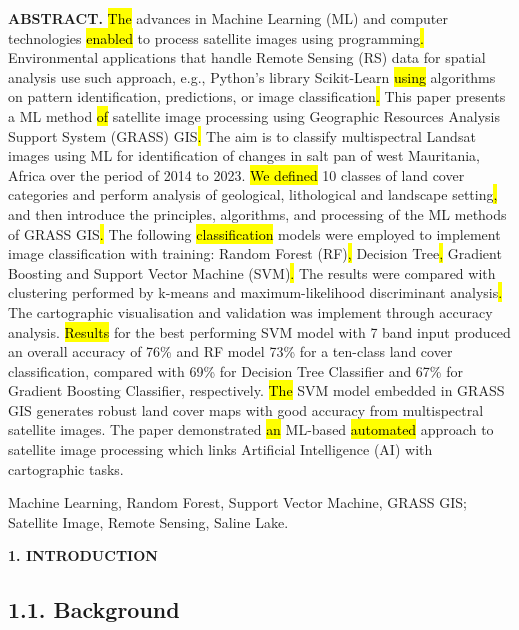 \documentclass[12pt,a4paper,oneside]{article}
\def \newsection{\vspace{12pt}\textbf}
\def \newpar{\vspace{6pt}}
\begin{document}
{\bf ABSTRACT.} \hl{The} advances in Machine Learning (ML) and computer technologies \hl{enabled} to process satellite images using programming\hl{. }Environmental applications that handle Remote Sensing (RS) data for spatial analysis use such approach, e.g., Python's library Scikit-Learn \hl{using} algorithms on pattern identification, predictions, or image classification\hl{. }This paper presents a ML method\hl{ of }satellite image processing using Geographic Resources Analysis Support System (GRASS) GIS\hl{. }The aim\hl{ }is to classify\hl{ }multispectral Landsat images using ML for identification of changes in salt pan of west Mauritania, Africa over the period of 2014 to 2023. \hl{We defined} 10 classes of land cover categories and perform analysis of geological, lithological and landscape setting\hl{, }and then introduce the principles, algorithms, and processing of the ML methods of GRASS GIS\hl{. }The following \hl{classification }models were employed to implement image classification with training: Random Forest (RF)\hl{, }Decision Tree\hl{, }Gradient Boosting\hl{ }and Support Vector Machine (SVM)\hl{. }The results\hl{ }were compared with clustering performed by k-means and\hl{ }maximum-likelihood discriminant analysis\hl{. }The cartographic visualisation and validation was implement through accuracy analysis. \hl{Results} for the best performing SVM model with 7 band input produced an overall accuracy of 76\% and RF model 73\% for a ten-class land cover classification, compared with 69\% for Decision Tree Classifier and 67\% for Gradient Boosting Classifier, respectively. \hl{The} SVM model embedded in GRASS GIS generates robust land cover maps with good accuracy from\hl{ }multispectral satellite images.  The paper demonstrated \hl{an} ML-based \hl{automated} approach to satellite image processing which links Artificial Intelligence (AI) with cartographic tasks.

\newpar {\bf Keywords:} Machine Learning, Random Forest, Support Vector Machine, GRASS GIS; Satellite Image, Remote Sensing, Saline Lake.

\newsection {1. INTRODUCTION}

\subsection*{1.1. Background}
\end{document}
